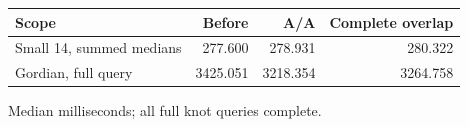 \begin{center}\small
\begin{tabular}{@{}lrrr@{}}
\toprule
Scope & Before & A/A & Complete overlap \\
\midrule
Small 14, summed medians & 277.600 & 278.931 & 280.322 \\
Gordian, full query & 3425.051 & 3218.354 & 3264.758 \\
\bottomrule
\end{tabular}
\end{center}
Median milliseconds; all full knot queries complete.
